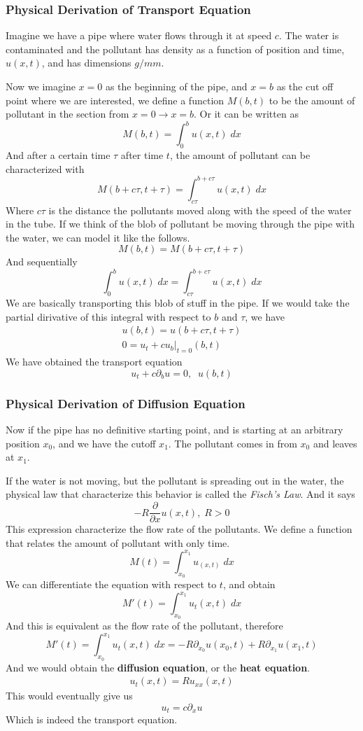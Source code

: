 \documentclass[12pt]{book}
\newcommand{\pypx}[2]{\frac{\partial #1}{\partial #2}}
\begin{document}
\subsubsection{Physical Derivation of Transport Equation}
Imagine we have a pipe where water flows through it at speed $c$. The water is contaminated and the pollutant has density as a function of position and time, $u(x,t)$, and has dimensions $g/mm$.  

Now we imagine $x=0$ as the beginning of the pipe, and $x=b$ as the cut off point where we are interested, we define a function $M(b,t)$ to be the amount of pollutant in the section from $x=0 \to x=b$. Or it can be written as
\[
M(b,t) = \int_{0}^{b}u(x,t)\;dx
\]
And after a certain time $\tau$ after time $t$, the amount of pollutant can be characterized with
\[
M(b+c\tau,t+\tau) = \int_{c\tau}^{b+c\tau}u(x,t)\;dx
\]
Where $c\tau$ is the distance the pollutants moved along with the speed of the water in the tube. 
If we think of the blob of pollutant be moving through the pipe with the water, we can model it like the follows. 
\[
M(b,t) = M(b+c\tau,t+\tau)
\]
And sequentially
\[
\int_{0}^{b}u(x,t)\;dx = \int_{c\tau}^{b+c\tau}u(x,t)\;dx
\]
We are basically transporting this blob of stuff in the pipe. If we would take the partial dirivative of this integral with respect to $b$ and $\tau$, we have
\begin{align*}
    u(b,t) = u(b+c\tau,t+\tau)\\
    \left. 0 = u_t + cu_b \right|_{t=0}(b,t)
\end{align*}
We have obtained the transport equation
\[
u_t + c\partial_b u = 0, \;\; u(b,t)
\]

\subsubsection{Physical Derivation of Diffusion Equation}
Now if the pipe has no definitive starting point, and is starting at an arbitrary position $x_0$, and we have the cutoff $x_1$. The pollutant comes in from $x_0$ and leaves at $x_1$. 

If the water is not moving, but the pollutant is spreading out in the water, the physical law that characterize this behavior is called the \textit{Fisch's Law}. And it says
\[
-R \pypx{}{x}u(x,t),\; R > 0
\]
This expression characterize the flow rate of the pollutants.
We define a function that relates the amount of pollutant with only time.
\[
M(t) = \int_{x_0}^{x_1}u_(x,t)\; dx
\]
We can differentiate the equation with respect to $t$, and obtain
\[
M'(t) = \int_{x_0}^{x_1}u_t(x,t)\; dx
\]
And this is equivalent as the flow rate of the pollutant, therefore
\[
M'(t) = \int_{x_0}^{x_1}u_t(x,t)\; dx = -R\partial_{x_0}u(x_0,t) + R\partial_{x_1}u(x_1,t) 
\]
And we would obtain the \textbf{diffusion equation}, or the \textbf{heat equation}.
\begin{align}
u_t(x,t) = Ru_{xx}(x,t)
\end{align}
This would eventually give us 
\[
u_t = c\partial_x u
\]
Which is indeed the transport equation. 
\end{document}
